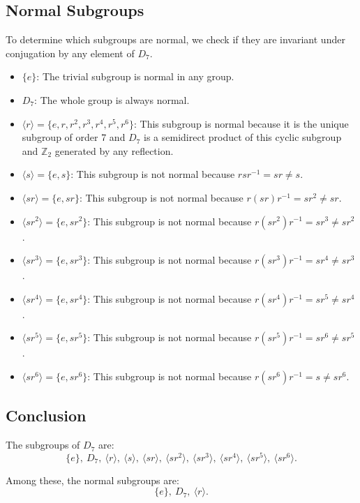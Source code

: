 \documentclass[12pt]{amsart}
\theoremstyle{definition}
\numberwithin{equation}{section}
\begin{document}
\begin{exercise}{1}
    \subsection*{Normal Subgroups}
    
    To determine which subgroups are normal, we check if they are invariant under conjugation by any element of \(D_7\).
    
    \begin{itemize}[label=--]
        \item \(\{e\}\): The trivial subgroup is normal in any group.
        \item \(D_7\): The whole group is always normal.
        \item \(\langle r \rangle = \{e, r, r^2, r^3, r^4, r^5, r^6\}\): This subgroup is normal because it is the unique subgroup of order 7 and \(D_7\) is a semidirect product of this cyclic subgroup and \(\mathbb{Z}_2\) generated by any reflection.
        \item \(\langle s \rangle = \{e, s\}\): This subgroup is not normal because \(r s r^{-1} = sr \neq s\).
        \item \(\langle sr \rangle = \{e, sr\}\): This subgroup is not normal because \(r (sr) r^{-1} = sr^2 \neq sr\).
        \item \(\langle sr^2 \rangle = \{e, sr^2\}\): This subgroup is not normal because \(r (sr^2) r^{-1} = sr^3 \neq sr^2\).
        \item \(\langle sr^3 \rangle = \{e, sr^3\}\): This subgroup is not normal because \(r (sr^3) r^{-1} = sr^4 \neq sr^3\).
        \item \(\langle sr^4 \rangle = \{e, sr^4\}\): This subgroup is not normal because \(r (sr^4) r^{-1} = sr^5 \neq sr^4\).
        \item \(\langle sr^5 \rangle = \{e, sr^5\}\): This subgroup is not normal because \(r (sr^5) r^{-1} = sr^6 \neq sr^5\).
        \item \(\langle sr^6 \rangle = \{e, sr^6\}\): This subgroup is not normal because \(r (sr^6) r^{-1} = s \neq sr^6\).
    \end{itemize}
    
    \subsection*{Conclusion}
    
    The subgroups of \(D_7\) are:
    \[
    \{e\}, \ D_7, \ \langle r \rangle, \ \langle s \rangle, \ \langle sr \rangle, \ \langle sr^2 \rangle, \ \langle sr^3 \rangle, \ \langle sr^4 \rangle, \ \langle sr^5 \rangle, \ \langle sr^6 \rangle.
    \]
    
    Among these, the normal subgroups are:
    \[
    \{e\}, \ D_7, \ \langle r \rangle.
    \]
    
\end{exercise}
\newpage
\end{document}
